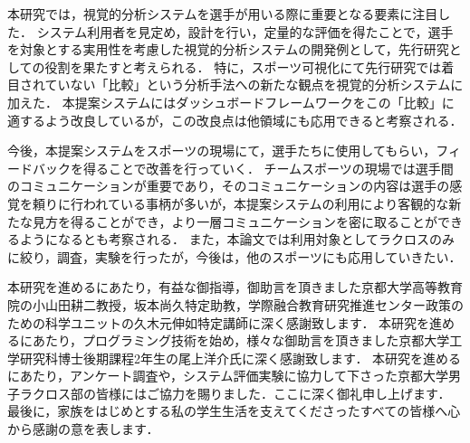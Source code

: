 \documentclass[sotsuron]{kuee}
\begin{document}
	本研究では，視覚的分析システムを選手が用いる際に重要となる要素に注目した．
	システム利用者を見定め，設計を行い，定量的な評価を得たことで，選手を対象とする実用性を考慮した視覚的分析システムの開発例として，先行研究としての役割を果たすと考えられる．
	特に，スポーツ可視化にて先行研究では着目されていない「比較」という分析手法への新たな観点を視覚的分析システムに加えた．
	本提案システムにはダッシュボードフレームワークをこの「比較」に適するよう改良しているが，この改良点は他領域にも応用できると考察される．

	今後，本提案システムをスポーツの現場にて，選手たちに使用してもらい，フィードバックを得ることで改善を行っていく．
	チームスポーツの現場では選手間のコミュニケーションが重要であり，そのコミュニケーションの内容は選手の感覚を頼りに行われている事柄が多いが，本提案システムの利用により客観的な新たな見方を得ることができ，より一層コミュニケーションを密に取ることができるようになるとも考察される．
	また，本論文では利用対象としてラクロスのみに絞り，調査，実験を行ったが，今後は，他のスポーツにも応用していきたい．



\begin{acknowledgements}
	本研究を進めるにあたり，有益な御指導，御助言を頂きました京都大学高等教育院の小山田耕二教授，坂本尚久特定助教，学際融合教育研究推進センター政策のための科学ユニットの久木元伸如特定講師に深く感謝致します．
	本研究を進めるにあたり，プログラミング技術を始め，様々な御助言を頂きました京都大学工学研究科博士後期課程2年生の尾上洋介氏に深く感謝致します．
	本研究を進めるにあたり，アンケート調査や，システム評価実験に協力して下さった京都大学男子ラクロス部の皆様にはご協力を賜りました．ここに深く御礼申し上げます．
	最後に，家族をはじめとする私の学生生活を支えてくださったすべての皆様へ心から感謝の意を表します．
\end{acknowledgements}








\appendix
\end{document}
